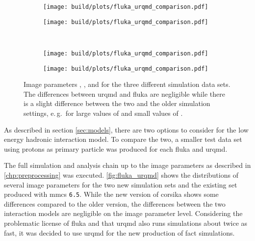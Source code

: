 \begin{figure}
  \centering
  \begin{subfigure}{0.5\textwidth}%
    \texttt{[image: build/plots/fluka\_urqmd\_comparison.pdf]}%
  \end{subfigure}%
  \begin{subfigure}{0.5\textwidth}%
    \texttt{[image: build/plots/fluka\_urqmd\_comparison.pdf]}%
  \end{subfigure}\\
  \begin{subfigure}{0.5\textwidth}%
    \texttt{[image: build/plots/fluka\_urqmd\_comparison.pdf]}%
  \end{subfigure}%
  \begin{subfigure}{0.5\textwidth}%
    \texttt{[image: build/plots/fluka\_urqmd\_comparison.pdf]}%
  \end{subfigure}%
  \caption{%
    Image parameters , ,  and   for
    the three different simulation data sets. 
    The differences between \gls{urqmd} and \gls{fluka} are negligible while
    there is a slight difference between the two and the older simulation settings,
    e.\,g.\ for large values of  and small values of .
  }\label{fig:fluka_urqmd}
\end{figure}

As described in section \ref{sec:models}, there are two options to consider for the
low energy hadronic interaction model.
To compare the two, a smaller test data set using protons as primary particle was produced for each \gls{fluka} and \gls{urqmd}. 

The full simulation and analysis chain up to the image parameters as described in
\autoref{chp:preprocessing} was executed.
\autoref{fig:fluka_urqmd} shows the distributions of several image parameters
for the two new simulation sets and the existing set produced with \gls{mmcs} \texttt{6.5}.
While the new version of \gls{corsika} shows some differences compared to
the older version, the differences between the two interaction models are negligible 
on the image parameter level.
Considering the problematic license of \gls{fluka} and that \gls{urqmd} also runs
simulations about twice as fast, it was decided to use \gls{urqmd} for the new production
of \gls{fact} simulations.

